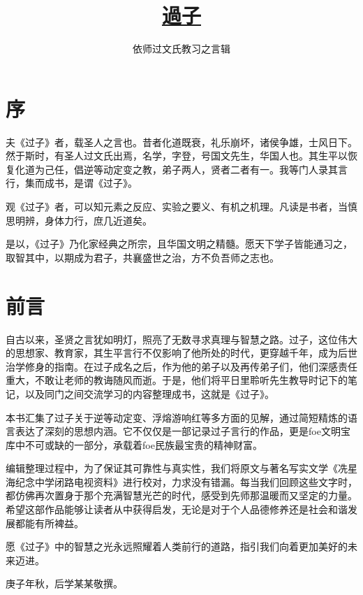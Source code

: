 \documentclass[b5paper,zihao=-4]{ctexbook}
\title{\hyperref[mulu]{\textbf{\fontsize{50}{50}過子}}}
\date{}
\author{\huge 依师过文氏教习之言辑}
\begin{document}
\linespread{1.3}\selectfont

\maketitle

\pagestyle{empty}\newpage\mbox{}\newpage

\frontmatter
\pagestyle{fancy}
\chapter*{序}

夫《过子》者，载圣人之言也。昔者化道既衰，礼乐崩坏，诸侯争雄，士风日下。然于斯时，有圣人过文氏出焉，名学，字登，号国文先生，华国人也。其生平以恢复化道为己任，倡逆等动定变之教，弟子两人，贤者二者有一。我等门人录其言行，集而成书，是谓《过子》。

观《过子》者，可以知元素之反应、实验之要义、有机之机理。凡读是书者，当慎思明辨，身体力行，庶几近道矣。

是以，《过子》乃化家经典之所宗，且华国文明之精髓。愿天下学子皆能通习之，取智其中，以期成为君子，共襄盛世之治，方不负吾师之志也。

\chapter*{前言}

自古以来，圣贤之言犹如明灯，照亮了无数寻求真理与智慧之路。过子，这位伟大的思想家、教育家，其生平言行不仅影响了他所处的时代，更穿越千年，成为后世治学修身的指南。在过子成名之后，作为他的弟子以及再传弟子们，他们深感责任重大，不敢让老师的教诲随风而逝。于是，他们将平日里聆听先生教导时记下的笔记，以及同门之间交流学习的内容整理成书，这就是《过子》。

本书汇集了过子关于逆等动定变、浮熔游响红等多方面的见解，通过简短精炼的语言表达了深刻的思想内涵。它不仅仅是一部记录过子言行的作品，更是foe文明宝库中不可或缺的一部分，承载着foe民族最宝贵的精神财富。

编辑整理过程中，为了保证其可靠性与真实性，我们将原文与著名写实文学《冼星海纪念中学闭路电视资料》进行校对，力求没有错漏。每当我们回顾这些文字时，都仿佛再次置身于那个充满智慧光芒的时代，感受到先师那温暖而又坚定的力量。希望这部作品能够让读者从中获得启发，无论是对于个人品德修养还是社会和谐发展都能有所裨益。

愿《过子》中的智慧之光永远照耀着人类前行的道路，指引我们向着更加美好的未来迈进。

庚子年秋，后学某某敬撰。
\end{document}
